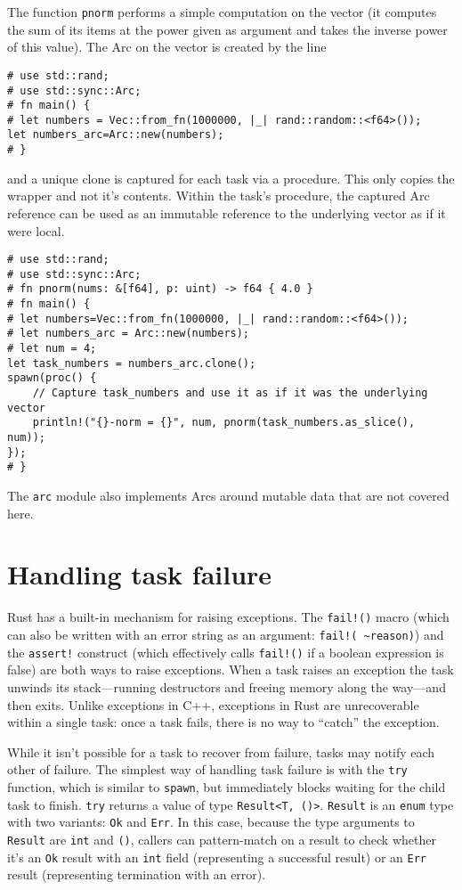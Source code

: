\documentclass[]{article}
\begin{document}
The function \texttt{pnorm} performs a simple computation on the vector
(it computes the sum of its items at the power given as argument and
takes the inverse power of this value). The Arc on the vector is created
by the line

\begin{verbatim}
# use std::rand;
# use std::sync::Arc;
# fn main() {
# let numbers = Vec::from_fn(1000000, |_| rand::random::<f64>());
let numbers_arc=Arc::new(numbers);
# }
\end{verbatim}

and a unique clone is captured for each task via a procedure. This only
copies the wrapper and not it's contents. Within the task's procedure,
the captured Arc reference can be used as an immutable reference to the
underlying vector as if it were local.

\begin{verbatim}
# use std::rand;
# use std::sync::Arc;
# fn pnorm(nums: &[f64], p: uint) -> f64 { 4.0 }
# fn main() {
# let numbers=Vec::from_fn(1000000, |_| rand::random::<f64>());
# let numbers_arc = Arc::new(numbers);
# let num = 4;
let task_numbers = numbers_arc.clone();
spawn(proc() {
    // Capture task_numbers and use it as if it was the underlying vector
    println!("{}-norm = {}", num, pnorm(task_numbers.as_slice(), num));
});
# }
\end{verbatim}

The \texttt{arc} module also implements Arcs around mutable data that
are not covered here.

\section{Handling task failure}\label{handling-task-failure}

Rust has a built-in mechanism for raising exceptions. The
\texttt{fail!()} macro (which can also be written with an error string
as an argument: \texttt{fail!( \textasciitilde{}reason)}) and the
\texttt{assert!} construct (which effectively calls \texttt{fail!()} if
a boolean expression is false) are both ways to raise exceptions. When a
task raises an exception the task unwinds its stack---running
destructors and freeing memory along the way---and then exits. Unlike
exceptions in C++, exceptions in Rust are unrecoverable within a single
task: once a task fails, there is no way to ``catch'' the exception.

While it isn't possible for a task to recover from failure, tasks may
notify each other of failure. The simplest way of handling task failure
is with the \texttt{try} function, which is similar to \texttt{spawn},
but immediately blocks waiting for the child task to finish.
\texttt{try} returns a value of type
\texttt{Result\textless{}T, ()\textgreater{}}. \texttt{Result} is an
\texttt{enum} type with two variants: \texttt{Ok} and \texttt{Err}. In
this case, because the type arguments to \texttt{Result} are
\texttt{int} and \texttt{()}, callers can pattern-match on a result to
check whether it's an \texttt{Ok} result with an \texttt{int} field
(representing a successful result) or an \texttt{Err} result
(representing termination with an error).
\end{document}
